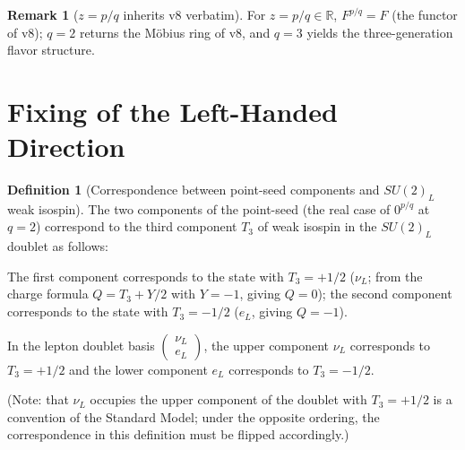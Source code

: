 \documentclass[11pt]{article}
\theoremstyle{plain}
\theoremstyle{definition}
\newtheorem{defn}[thm]{Definition}
\newtheorem{rem}[thm]{Remark}
\begin{document}
\begin{rem}[$z=p/q$ inherits v8 verbatim]\label{rem:inherit}
For $z = p/q\in\mathbb{R}$, $F^{p/q} = F$ (the functor of v8); $q=2$
returns the M\"obius ring of v8, and $q=3$ yields the three-generation
flavor structure.
\end{rem}

\section{Fixing of the Left-Handed Direction}

\begin{defn}[Correspondence between point-seed components and $SU(2)_L$ weak isospin]\label{def:su2}
The two components of the point-seed (the real case of $0^{p/q}$ at $q=2$)
correspond to the third component $T_3$ of weak isospin in the $SU(2)_L$
doublet as follows:

The first component corresponds to the state with $T_3 = +1/2$
($\nu_L$; from the charge formula $Q = T_3 + Y/2$ with $Y=-1$, giving
$Q=0$);
the second component corresponds to the state with $T_3 = -1/2$ ($e_L$,
giving $Q=-1$).

In the lepton doublet basis
$\begin{pmatrix}\nu_L\\ e_L\end{pmatrix}$, the upper component $\nu_L$
corresponds to $T_3=+1/2$ and the lower component $e_L$ corresponds to
$T_3=-1/2$.

(Note: that $\nu_L$ occupies the upper component of the doublet with
$T_3=+1/2$ is a convention of the Standard Model; under the opposite
ordering, the correspondence in this definition must be flipped
accordingly.)
\end{defn}
\end{document}
